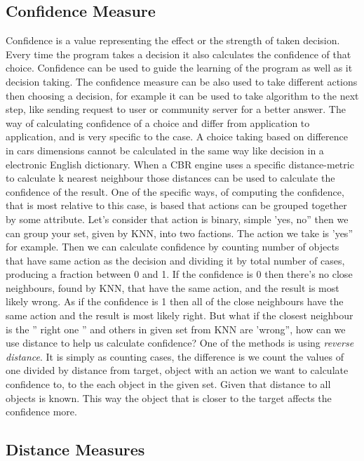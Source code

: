 \subsection{Confidence Measure}\label{confidenceMeasure}
Confidence is a value representing the effect or the strength of taken decision. Every time the program takes a decision it also calculates the confidence of that choice. Confidence can be used to guide the learning of the program as well as it decision taking. The confidence measure can be also used to take different actions then choosing a decision, for example it can be used to take algorithm to the next step, like sending request to user or community server for a better answer.
The way of calculating confidence of a choice and differ from application to application, and is very specific to the case. A choice taking based on difference in cars dimensions cannot be calculated in the same way like decision in a electronic English dictionary. When a CBR engine uses a specific distance-metric to calculate k nearest neighbour those distances can be used to calculate the confidence of the result. 
One of the specific ways, of computing the confidence, that is most relative to this case, is based that actions can be grouped together by some attribute. Let's consider that action is binary, simple  \left'yes, no\right'' then we can group your set, given by KNN, into two factions. The action we take is  \left'yes\right'' for example. Then we can calculate confidence by counting number of objects that have same action as the decision and dividing it by total number of cases, producing a fraction between 0 and 1. If the confidence is 0 then there's no close neighbours, found by KNN, that have the same action, and the result is most likely wrong. As if the confidence is 1 then all of the close neighbours have the same action and the result is most likely right. 
But what if the closest neighbour is the \left'' right one \right''  and others in given set from KNN are  \left'wrong\right'', how can we use distance to help us calculate confidence? One of the methods is using \textit{reverse distance}. It is simply as counting cases, the difference is we count the values of one divided by distance from target, object with an action we want to calculate confidence to, to the each object in the given set. Given that distance to all objects is known. This way the object that is closer to the target affects the confidence more.


\subsection{Distance Measures}\label{SimilarityMeasures} 

